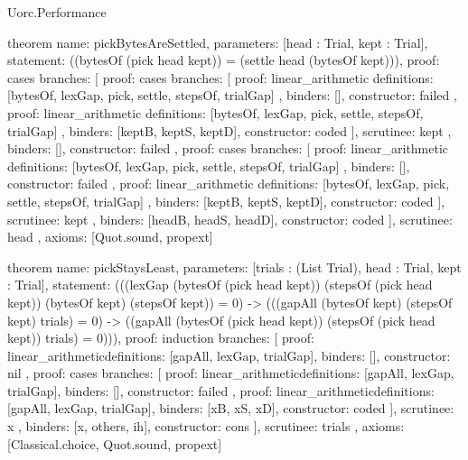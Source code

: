 \begin{lexlean}{Uorc.Performance}
\begin{semanticmodule}
theorem{
  name: pickBytesAreSettled,
  parameters: [head : Trial, kept : Trial],
  statement: ((bytesOf (pick head kept)) = (settle head (bytesOf kept))),
  proof: cases{
    branches: [
      {
        proof: cases{
          branches: [
            {
              proof: linear_arithmetic{
                definitions: [bytesOf, lexGap, pick, settle, stepsOf, trialGap]
              },
              binders: [],
              constructor: failed
            },
            {
              proof: linear_arithmetic{
                definitions: [bytesOf, lexGap, pick, settle, stepsOf, trialGap]
              },
              binders: [keptB, keptS, keptD],
              constructor: coded
            }
          ],
          scrutinee: kept
        },
        binders: [],
        constructor: failed
      },
      {
        proof: cases{
          branches: [
            {
              proof: linear_arithmetic{
                definitions: [bytesOf, lexGap, pick, settle, stepsOf, trialGap]
              },
              binders: [],
              constructor: failed
            },
            {
              proof: linear_arithmetic{
                definitions: [bytesOf, lexGap, pick, settle, stepsOf, trialGap]
              },
              binders: [keptB, keptS, keptD],
              constructor: coded
            }
          ],
          scrutinee: kept
        },
        binders: [headB, headS, headD],
        constructor: coded
      }
    ],
    scrutinee: head
  },
  axioms: [Quot.sound, propext]
}

theorem{
  name: pickStaysLeast,
  parameters: [trials : (List Trial), head : Trial, kept : Trial],
  statement: (((lexGap (bytesOf (pick head kept)) (stepsOf (pick head kept)) (bytesOf kept) (stepsOf kept)) = 0) -> (((gapAll (bytesOf kept) (stepsOf kept) trials) = 0) -> ((gapAll (bytesOf (pick head kept)) (stepsOf (pick head kept)) trials) = 0))),
  proof: induction{
    branches: [
      {
        proof: linear_arithmetic{definitions: [gapAll, lexGap, trialGap]},
        binders: [],
        constructor: nil
      },
      {
        proof: cases{
          branches: [
            {
              proof: linear_arithmetic{definitions: [gapAll, lexGap, trialGap]},
              binders: [],
              constructor: failed
            },
            {
              proof: linear_arithmetic{definitions: [gapAll, lexGap, trialGap]},
              binders: [xB, xS, xD],
              constructor: coded
            }
          ],
          scrutinee: x
        },
        binders: [x, others, ih],
        constructor: cons
      }
    ],
    scrutinee: trials
  },
  axioms: [Classical.choice, Quot.sound, propext]
}


\end{semanticmodule}
\end{lexlean}
